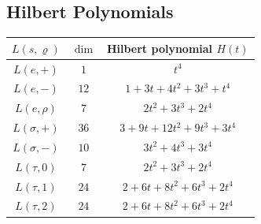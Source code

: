 \subsection{Hilbert Polynomials}

\begin{center}
\begin{tabular}{c|c|c}
\hline
$L(s,\varrho)$ & $\dim$ & Hilbert polynomial $H(t)$ \\
\hline
$L(e,+)$ & $1$ & $t^{4}$ \\
$L(e,-)$ & $12$ & $1 + 3t + 4t^{2} + 3t^{3} + t^{4}$ \\
$L(e,\rho)$ & $7$ & $2t^{2} + 3t^{3} + 2t^{4}$ \\
$L(\sigma,+)$ & $36$ & $3 + 9t + 12t^{2} + 9t^{3} + 3t^{4}$ \\
$L(\sigma,-)$ & $10$ & $3t^{2} + 4t^{3} + 3t^{4}$ \\
$L(\tau,0)$ & $7$ & $2t^{2} + 3t^{3} + 2t^{4}$ \\
$L(\tau,1)$ & $24$ & $2 + 6t + 8t^{2} + 6t^{3} + 2t^{4}$ \\
$L(\tau,2)$ & $24$ & $2 + 6t + 8t^{2} + 6t^{3} + 2t^{4}$ \\
\hline
\end{tabular}
\end{center}
